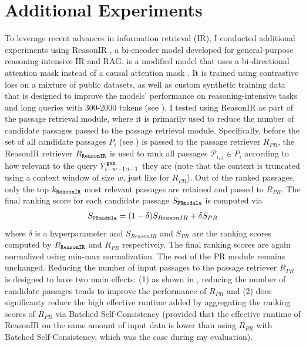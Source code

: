 \section{Additional Experiments}\label{additional-experiments}
To leverage recent advances in information retrieval (IR), I conducted additional experiments using ReasonIR \cite{shao2025reasonir}, a bi-encoder model developed for general-purpose reasoning-intensive IR and RAG.  is a modified  \cite{touvron2023llama} model that uses a bi-directional attention mask \cite{muennighoff2024generative} instead of a causal attention mask \cite{shao2025reasonir}. It is trained using contrastive loss on a mixture of public datasets, as well as custom synthetic training data that is designed to improve the models' performance on reasoning-intensive tasks and long queries with 300-2000 tokens (see \cite{shao2025reasonir}). I tested using ReasonIR as part of the passage retrieval module, where it is primarily used to reduce the number of candidate passages passed to the passage retrieval module. Specifically, before the set of all candidate passages $P_i$ (see ) is passed to the passage retriever $R_{PR}$, the ReasonIR retriever $R_{\texttt{ReasonIR}}$ is used to rank all passages $\mathcal{P}_{i,j}\in P_i$ according to how relevant to the query $Y^{\texttt{gen}}_{i-w-1:i-1}$ they are (note that the context is truncated using a context window of size $w$, just like for $R_{PR}$). Out of the ranked passages, only the top $k_{\texttt{ReasonIR}}$ most relevant passages are retained and passed to $R_{PR}$. The final ranking score for each candidate passage $S_{\texttt{PRmodule}}$ is computed via
\begin{align}
    S_{\texttt{PRmodule}} = (1-\delta)S_{ReasonIR}+\delta S_{PR}
\end{align}
where $\delta$ is a hyperparameter and $S_{ReasonIR}$ and $S_{PR}$ are the ranking scores computed by $R_{\texttt{ReasonIR}}$ and $R_{PR}$ respectively. The final ranking scores are again normalized using min-max normalization. The rest of the PR module remains unchanged. Reducing the number of input passages to the passage retriever $R_{PR}$ is designed to have two main effects: (1) as shown in , reducing the number of candidate passages tends to improve the performance of $R_{PR}$ and (2) does significanty reduce the high effective runtime added by aggregating the ranking scores of $R_{PR}$ via Batched Self-Consistency (provided that the effective runtime of ReasonIR on the same amount of input data is lower than using $R_{PR}$ with Batched Self-Consistency, which was the case during my evaluation).

